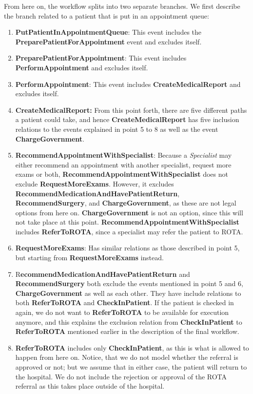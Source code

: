 From here on, the workflow splits into two separate branches. We first describe the branch related to a patient that is put in an appointment queue: 
\begin{enumerate}
\item \textbf{PutPatientInAppointmentQueue}: This event includes the \textbf{PreparePatientForAppointment} event and excludes itself.
\item \textbf{PreparePatientForAppointment}: This event includes \textbf{PerformAppointment} and excludes itself.
\item \textbf{PerformAppointment}: This event includes \textbf{CreateMedicalReport} and excludes itself.  
\item \textbf{CreateMedicalReport:} From this point forth, there are five different paths a patient could take, and hence \textbf{CreateMedicalReport} has five inclusion relations to the events explained in point 5 to 8 as well as the event \textbf{ChargeGovernment}.
\item \textbf{RecommendAppointmentWithSpecialist}: Because a \textit{Specialist} may either  recommend an appointment with another specialist, request more exams or both, \textbf{RecommendAppointmentWithSpecialist} does not exclude \textbf{RequestMoreExams}. However, it excludes \textbf{RecommendMedicationAndHavePatientReturn}, \textbf{RecommendSurgery}, and \textbf{ChargeGovernment}, as these are not legal options from here on. \textbf{ChargeGovernment} is not an option, since this will not take place at this point. \textbf{RecommendAppointmentWithSpecialist} includes \textbf{ReferToROTA}, since a specialist may refer the patient to ROTA. 
\item \textbf{RequestMoreExams}: Has similar relations as those described in point 5, but starting from \textbf{RequestMoreExams} instead.
\item R\textbf{ecommendMedicationAndHavePatientReturn} and \textbf{RecommendSurgery} both exclude the events mentioned in point 5 and 6, \textbf{ChargeGovernment} as well as each other. They have include relations to both \textbf{ReferToROTA} and \textbf{CheckInPatient}. If the patient is checked in again, we do not want to \textbf{ReferToROTA} to be available for execution anymore, and this explains the exclusion relation from \textbf{CheckInPatient} to \textbf{ReferToROTA} mentioned earlier in the description of the final workflow.
\item \textbf{ReferToROTA} includes only \textbf{CheckInPatient}, as this is what is allowed to happen from here on. Notice, that we do not model whether the referral is approved or not; but we assume that in either case, the patient will return to the hospital. We do not include the rejection or approval of the ROTA referral as this takes place outside of the hospital.
\end{enumerate}

